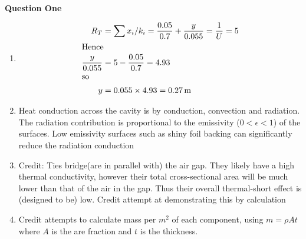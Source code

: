 \documentclass[a4paper,12pt,fleqn]{article}
\begin{document}
\textbf{Question One}

\begin{enumerate}[label=\alph*)]
\item 
\begin{align*}
R_T&=\sum{x_i/k_i}=\frac{0.05}{0.7}+\frac{y}{0.055}=\frac{1}{U}=5\\
\intertext{Hence}
\frac{y}{0.055}&=5-\frac{0.05}{0.7}=4.93\\
\intertext{so}
y&=0.055\times 4.93 = \SI{0.27}{\metre}
\end{align*}
\item Heat conduction across the cavity is by conduction, convection and radiation. The radiation contribution is proportional
to the emissivity ($0<\epsilon <1$) of the surfaces.
Low emissivity surfaces such as shiny foil backing can significantly reduce the radiation conduction
\item Credit: Ties bridge(are in parallel with) the air gap. They likely have a high thermal conductivity, however their total cross-sectional
area will be much lower than that of the air in the gap. Thus their overall thermal-short effect is (designed to be) low. 
Credit attempt at demonstrating this by calculation
\item Credit attempts to calculate mass per $m^2$ of each component, using $m=\rho At$ where $A$ is the are fraction and $t$ is the thickness.
\begin{table}[ht]

\end{table}
\end{enumerate}
\end{document}
